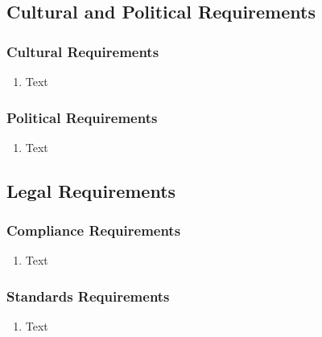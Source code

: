 \documentclass [11pt]{article}
\begin{document}
\subsection{Cultural and Political Requirements } 

\subsubsection{Cultural Requirements }
	\begin{enumerate}[label=\textbf{(\roman*)}]
		\item Text
	\end{enumerate}

\subsubsection{Political Requirements }
	\begin{enumerate}[label=\textbf{(\roman*)}]
		\item Text
	\end{enumerate}

\subsection{Legal Requirements}

\subsubsection{Compliance Requirements }
	\begin{enumerate}[label=\textbf{(\roman*)}]
		\item Text
	\end{enumerate}

\subsubsection{Standards Requirements }
	\begin{enumerate}[label=\textbf{(\roman*)}]
		\item Text
	\end{enumerate}
\end{document}
